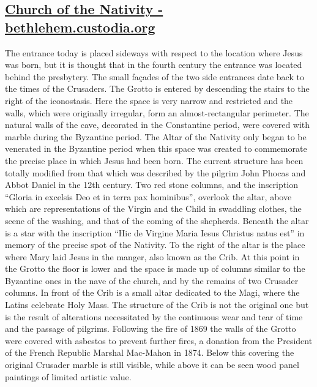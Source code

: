 \documentclass[letterpaper]{report}
\begin{document}
\begin{multicols}{2}
\subsection{\href{http://www.bethlehem.custodia.org/default.asp?id=469}{
Church of the Nativity - bethlehem.custodia.org}}

The entrance today is placed sideways with respect to the location where Jesus was born, but it is thought that in the fourth century the entrance was located behind the presbytery. The small façades of the two side entrances date back to the times of the Crusaders.
The Grotto is entered by descending the stairs to the right of the iconostasis. Here the space is very narrow and restricted and the walls, which were originally irregular, form an almost-rectangular perimeter. The natural walls of the cave, decorated in the Constantine period, were covered with marble during the Byzantine period.
The Altar of the Nativity only began to be venerated in the Byzantine period when this space was created to commemorate the precise place in which Jesus had been born.
The current structure has been totally modified from that which was described by the pilgrim John Phocas and Abbot Daniel in the 12th century. Two red stone columns, and the inscription “Gloria in excelsis Deo et in terra pax hominibus”, overlook the altar, above which are representations of the Virgin and the Child in swaddling clothes, the scene of the washing, and that of the coming of the shepherds.
Beneath the altar is a star with the inscription “Hic de Virgine Maria Iesus Christus natus est” in memory of the precise spot of the Nativity. To the right of the altar is the place where Mary laid Jesus in the manger, also known as the Crib. At this point in the Grotto the floor is lower and the space is made up of columns similar to the Byzantine ones in the nave of the church, and by the remains of two Crusader columns.
In front of the Crib is a small altar dedicated to the Magi, where the Latins celebrate Holy Mass. The structure of the Crib is not the original one but is the result of alterations necessitated by the continuous wear and tear of time and the passage of pilgrims.
Following the fire of 1869 the walls of the Grotto were covered with asbestos to prevent further fires, a donation from the President of the French Republic Marshal Mac-Mahon in 1874. Below this covering the original Crusader marble is still visible, while above it can be seen wood panel paintings of limited artistic value.

\end{multicols}
\end{document}
